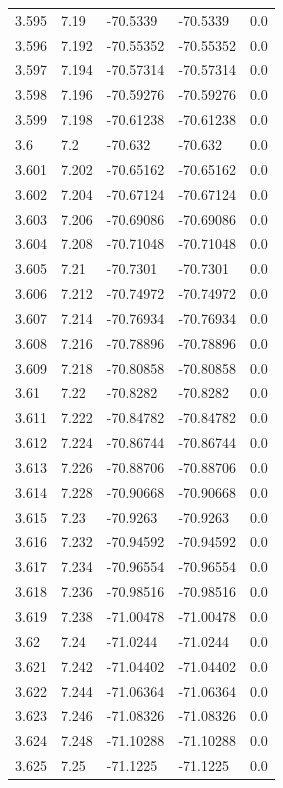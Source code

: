 \begin{tabular}{lllll}
3.595 & 7.19 & -70.5339 & -70.5339 & 0.0 \\
3.596 & 7.192 & -70.55352 & -70.55352 & 0.0 \\
3.597 & 7.194 & -70.57314 & -70.57314 & 0.0 \\
3.598 & 7.196 & -70.59276 & -70.59276 & 0.0 \\
3.599 & 7.198 & -70.61238 & -70.61238 & 0.0 \\
3.6 & 7.2 & -70.632 & -70.632 & 0.0 \\
3.601 & 7.202 & -70.65162 & -70.65162 & 0.0 \\
3.602 & 7.204 & -70.67124 & -70.67124 & 0.0 \\
3.603 & 7.206 & -70.69086 & -70.69086 & 0.0 \\
3.604 & 7.208 & -70.71048 & -70.71048 & 0.0 \\
3.605 & 7.21 & -70.7301 & -70.7301 & 0.0 \\
3.606 & 7.212 & -70.74972 & -70.74972 & 0.0 \\
3.607 & 7.214 & -70.76934 & -70.76934 & 0.0 \\
3.608 & 7.216 & -70.78896 & -70.78896 & 0.0 \\
3.609 & 7.218 & -70.80858 & -70.80858 & 0.0 \\
3.61 & 7.22 & -70.8282 & -70.8282 & 0.0 \\
3.611 & 7.222 & -70.84782 & -70.84782 & 0.0 \\
3.612 & 7.224 & -70.86744 & -70.86744 & 0.0 \\
3.613 & 7.226 & -70.88706 & -70.88706 & 0.0 \\
3.614 & 7.228 & -70.90668 & -70.90668 & 0.0 \\
3.615 & 7.23 & -70.9263 & -70.9263 & 0.0 \\
3.616 & 7.232 & -70.94592 & -70.94592 & 0.0 \\
3.617 & 7.234 & -70.96554 & -70.96554 & 0.0 \\
3.618 & 7.236 & -70.98516 & -70.98516 & 0.0 \\
3.619 & 7.238 & -71.00478 & -71.00478 & 0.0 \\
3.62 & 7.24 & -71.0244 & -71.0244 & 0.0 \\
3.621 & 7.242 & -71.04402 & -71.04402 & 0.0 \\
3.622 & 7.244 & -71.06364 & -71.06364 & 0.0 \\
3.623 & 7.246 & -71.08326 & -71.08326 & 0.0 \\
3.624 & 7.248 & -71.10288 & -71.10288 & 0.0 \\
3.625 & 7.25 & -71.1225 & -71.1225 & 0.0 \\

\end{tabular}
